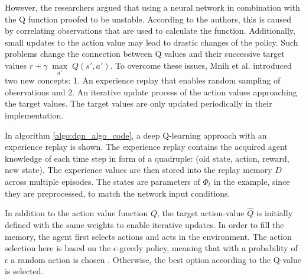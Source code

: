 However, the researchers argued that using a neural network in combination with the Q function proofed to be unstable. According to the authors, this is caused by correlating observations that are used to calculate the function. Additionally, small updates to the action value may lead to drastic changes of the policy. Such problems change the connection between Q values and their successive target values $r+\gamma \; \underset{a'} \max \; Q(s',a')$. To overcome these issues, Mnih et al. introduced two new concepts: 1. An experience replay that enables random sampling of observations and 2. An iterative update process of the action values approaching the target values. The target values are only updated periodically in their implementation.

In algorithm \ref{algo:dqn_algo_code}, a deep Q-learning approach with an experience replay is shown. The experience replay contains the acquired agent knowledge of each time step in form of a quadruple: (old state, action, reward, new state). The experience values are then stored into the replay memory $D$ across multiple episodes. The states are parameters of $\Phi_{t}$ in the example, since they are preprocessed, to match the network input conditions.

In addition to the action value function $Q$, the target action-value $\hat Q$ is initially defined with the same weights to enable iterative updates. In order to fill the memory, the agent first selects actions and acts in the environment. The action selection here is based on the $\epsilon$-greedy policy, meaning that with a probability of $\epsilon$ a random action is chosen \cite{mnka15}. Otherwise, the best option according to the Q-value is selected.

